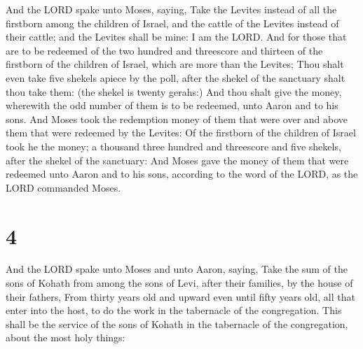  And the LORD spake unto Moses, saying, 
Take the Levites instead of all the firstborn among the children of
Israel, and the cattle of the Levites instead of their cattle; and the
Levites shall be mine: I am the LORD.  And for those that
are to be redeemed of the two hundred and threescore and thirteen of the
firstborn of the children of Israel, which are more than the Levites;
 Thou shalt even take five shekels apiece by the poll,
after the shekel of the sanctuary shalt thou take them: (the shekel is
twenty gerahs:)  And thou shalt give the money, wherewith
the odd number of them is to be redeemed, unto Aaron and to his sons.
 And Moses took the redemption money of them that were
over and above them that were redeemed by the Levites: 
Of the firstborn of the children of Israel took he the money; a thousand
three hundred and threescore and five shekels, after the shekel of the
sanctuary:  And Moses gave the money of them that were
redeemed unto Aaron and to his sons, according to the word of the LORD,
as the LORD commanded Moses.

\hypertarget{section-3}{%
\section{4}\label{section-3}}

 And the LORD spake unto Moses and unto Aaron, saying,
 Take the sum of the sons of Kohath from among the sons of
Levi, after their families, by the house of their fathers,
 From thirty years old and upward even until fifty years
old, all that enter into the host, to do the work in the tabernacle of
the congregation.  This shall be the service of the sons
of Kohath in the tabernacle of the congregation, about the most holy
things:

